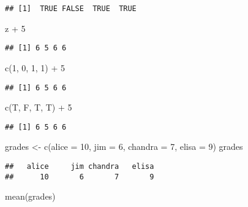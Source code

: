 \documentclass[
]{article}
\newenvironment{Shaded}{\begin{snugshade}}{\end{snugshade}}
\newcommand{\AttributeTok}[1]{\textcolor[rgb]{0.77,0.63,0.00}{#1}}
\newcommand{\DecValTok}[1]{\textcolor[rgb]{0.00,0.00,0.81}{#1}}
\newcommand{\FunctionTok}[1]{\textcolor[rgb]{0.00,0.00,0.00}{#1}}
\newcommand{\NormalTok}[1]{#1}
\newcommand{\OtherTok}[1]{\textcolor[rgb]{0.56,0.35,0.01}{#1}}
\newcommand{\SpecialCharTok}[1]{\textcolor[rgb]{0.00,0.00,0.00}{#1}}
\begin{document}
\begin{verbatim}
## [1]  TRUE FALSE  TRUE  TRUE
\end{verbatim}

\begin{Shaded}
\begin{Highlighting}[]
\NormalTok{z }\SpecialCharTok{+} \DecValTok{5}
\end{Highlighting}
\end{Shaded}

\begin{verbatim}
## [1] 6 5 6 6
\end{verbatim}

\begin{Shaded}
\begin{Highlighting}[]
\FunctionTok{c}\NormalTok{(}\DecValTok{1}\NormalTok{, }\DecValTok{0}\NormalTok{, }\DecValTok{1}\NormalTok{, }\DecValTok{1}\NormalTok{) }\SpecialCharTok{+} \DecValTok{5}
\end{Highlighting}
\end{Shaded}

\begin{verbatim}
## [1] 6 5 6 6
\end{verbatim}

\begin{Shaded}
\begin{Highlighting}[]
\FunctionTok{c}\NormalTok{(T, F, T, T) }\SpecialCharTok{+} \DecValTok{5}
\end{Highlighting}
\end{Shaded}

\begin{verbatim}
## [1] 6 5 6 6
\end{verbatim}

\begin{Shaded}
\begin{Highlighting}[]
\NormalTok{grades }\OtherTok{\textless{}{-}} \FunctionTok{c}\NormalTok{(}\AttributeTok{alice =} \DecValTok{10}\NormalTok{, }\AttributeTok{jim =} \DecValTok{6}\NormalTok{, }\AttributeTok{chandra =} \DecValTok{7}\NormalTok{, }\AttributeTok{elisa =} \DecValTok{9}\NormalTok{)}
\NormalTok{grades}
\end{Highlighting}
\end{Shaded}

\begin{verbatim}
##   alice     jim chandra   elisa 
##      10       6       7       9
\end{verbatim}

\begin{Shaded}
\begin{Highlighting}[]
\FunctionTok{mean}\NormalTok{(grades)}
\end{Highlighting}
\end{Shaded}
\end{document}
